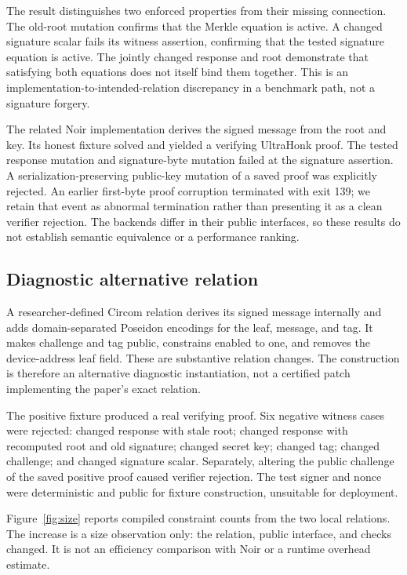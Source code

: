 \documentclass[sigconf,nonacm]{acmart}
\begin{document}
The result distinguishes two enforced properties from their missing connection. The old-root mutation confirms that the Merkle equation is active. A changed signature scalar fails its witness assertion, confirming that the tested signature equation is active. The jointly changed response and root demonstrate that satisfying both equations does not itself bind them together. This is an implementation-to-intended-relation discrepancy in a benchmark path, not a signature forgery.

The related Noir implementation derives the signed message from the root and key. Its honest fixture solved and yielded a verifying UltraHonk proof. The tested response mutation and signature-byte mutation failed at the signature assertion. A serialization-preserving public-key mutation of a saved proof was explicitly rejected. An earlier first-byte proof corruption terminated with exit 139; we retain that event as abnormal termination rather than presenting it as a clean verifier rejection. The backends differ in their public interfaces, so these results do not establish semantic equivalence or a performance ranking.

\subsection{Diagnostic alternative relation}
A researcher-defined Circom relation derives its signed message internally and adds domain-separated Poseidon encodings for the leaf, message, and tag. It makes challenge and tag public, constrains enabled to one, and removes the device-address leaf field. These are substantive relation changes. The construction is therefore an alternative diagnostic instantiation, not a certified patch implementing the paper's exact relation.

The positive fixture produced a real verifying proof. Six negative witness cases were rejected: changed response with stale root; changed response with recomputed root and old signature; changed secret key; changed tag; changed challenge; and changed signature scalar. Separately, altering the public challenge of the saved positive proof caused verifier rejection. The test signer and nonce were deterministic and public for fixture construction, unsuitable for deployment.

Figure~\ref{fig:size} reports compiled constraint counts from the two local relations. The increase is a size observation only: the relation, public interface, and checks changed. It is not an efficiency comparison with Noir or a runtime overhead estimate.
\end{document}
